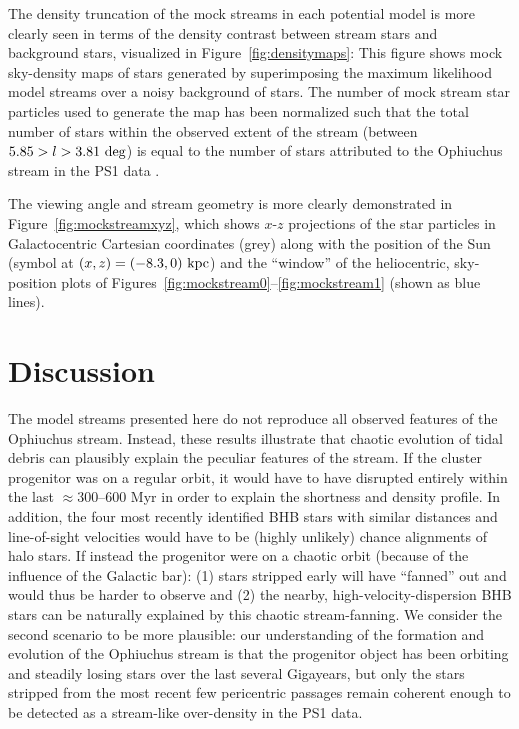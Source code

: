 \documentclass[numberedappendix]{emulateapj}
\begin{document}
The density truncation of the mock streams in each potential model is more clearly seen in terms of the density contrast between stream stars and background stars, visualized in Figure~\ref{fig:densitymaps}: This figure shows mock sky-density maps of stars generated by superimposing the maximum likelihood model streams over a noisy background of stars. The number of mock stream star particles used to generate the map has been normalized such that the total number of stars within the observed extent of the stream (between $5.85 > l > 3.81~{\rm deg}$) is equal to the number of stars attributed to the Ophiuchus stream in the PS1 data \citep[$N \approx 500$][]{bernard14}.

The viewing angle and stream geometry is more clearly demonstrated in Figure~\ref{fig:mockstreamxyz}, which shows $x$-$z$ projections of the star particles in Galactocentric Cartesian coordinates (grey) along with the position of the Sun (symbol at $(x,z)=(-8.3,0)~{\rm kpc}$) and the ``window'' of the heliocentric, sky-position plots of Figures~\ref{fig:mockstream0}--\ref{fig:mockstream1} (shown as blue lines). 


\section{Discussion}\label{sec:discussion}

The model streams presented here do not reproduce all observed features of the Ophiuchus stream. Instead, these results illustrate that chaotic evolution of tidal debris can plausibly explain the peculiar features of the stream. If the cluster progenitor was on a regular orbit, it would have to have disrupted entirely within the last $\approx$300--600 Myr in order to explain the shortness and density profile. In addition, the four most recently identified BHB stars with similar distances and line-of-sight velocities would have to be (highly unlikely) chance alignments of halo stars. If instead the progenitor were on a chaotic orbit (because of the influence of the Galactic bar): (1) stars stripped early will have ``fanned'' out and would thus be harder to observe and (2) the nearby, high-velocity-dispersion BHB stars can be naturally explained by this chaotic stream-fanning. We consider the second scenario to be more plausible: our understanding of the formation and evolution of the Ophiuchus stream is that the progenitor object has been orbiting and steadily losing stars over the last several Gigayears, but only the stars stripped from the most recent few pericentric passages remain coherent enough to be detected as a stream-like over-density in the PS1 data.
\end{document}
